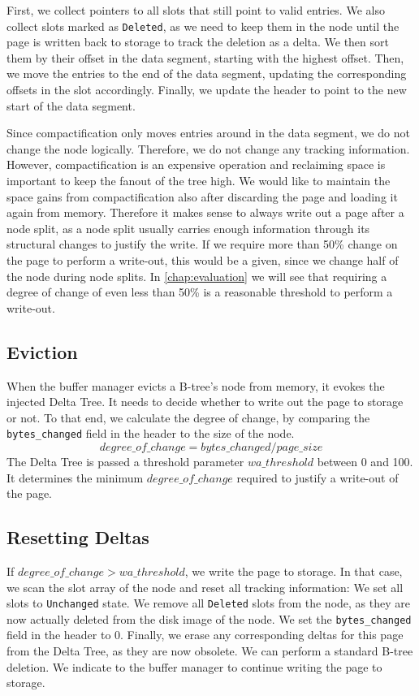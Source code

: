 First, we collect pointers to all slots that still point to valid entries.
We also collect slots marked as \texttt{Deleted}, as we need to keep them in the node until the page is written back to storage to track the deletion as a delta.
We then sort them by their offset in the data segment, starting with the highest offset.
Then, we move the entries to the end of the data segment, updating the corresponding offsets in the slot accordingly.
Finally, we update the header to point to the new start of the data segment.

Since compactification only moves entries around in the data segment, we do not change the node logically.
Therefore, we do not change any tracking information.
However, compactification is an expensive operation and reclaiming space is important to keep the fanout of the tree high.
We would like to maintain the space gains from compactification also after discarding the page and loading it again from memory.
Therefore it makes sense to always write out a page after a node split, as a node split usually carries enough information through its structural changes to justify the write.
If we require more than 50\% change on the page to perform a write-out, this would be a given, since we change half of the node during node splits.
In \ref{chap:evaluation} we will see that requiring a degree of change of even less than 50\% is a reasonable threshold to perform a write-out.

\subsection*{Eviction}
When the buffer manager evicts a B-tree's node from memory, it evokes the injected Delta Tree.
It needs to decide whether to write out the page to storage or not.
To that end, we calculate the degree of change, by comparing the \texttt{bytes\_changed} field in the header to the size of the node.
\[degree\_of\_change = bytes\_changed / page\_size\]
The Delta Tree is passed a threshold parameter $wa\_threshold$ between 0 and 100.
It determines the minimum $degree\_of\_change$ required to justify a write-out of the page.

\subsection*{Resetting Deltas}
If $degree\_of\_change > wa\_threshold$, we write the page to storage. 
In that case, we scan the slot array of the node and reset all tracking information:
We set all slots to \texttt{Unchanged} state.
We remove all \texttt{Deleted} slots from the node, as they are now actually deleted from the disk image of the node.
We set the \texttt{bytes\_changed} field in the header to 0.
Finally, we erase any corresponding deltas for this page from the Delta Tree, as they are now obsolete.
We can perform a standard B-tree deletion.
We indicate to the buffer manager to continue writing the page to storage.

